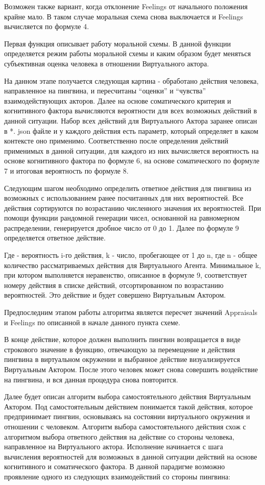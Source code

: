 Возможен также вариант, когда отклонение Feelings от начального положения крайне мало. В таком случае моральная схема снова выключается и Feelings вычисляется по формуле 4. 

Первая функция описывает работу моральной схемы. В данной функции определяется режим работы моральной схемы и каким образом будет меняться субъективная оценка человека в отношении Виртуального актора.

На данном этапе получается следующая картина - обработано действия человека, направленное на пингвина, и пересчитаны “оценки” и “чувства” взаимодействующих акторов. Далее на основе соматического критерия и когнитивного фактора вычисляются вероятности для всех возможных действий в данной ситуации. Набор всех действий для Виртуального Актора заранее описан в *. json файле и у каждого действия есть параметр, который определяет в каком контексте оно применимо. Соответственно после определения действий применимых в данной ситуации, для каждого из них вычисляется вероятность на основе когнитивного фактора по формуле 6, на основе соматического по формуле 7 и итоговая вероятность по формуле 8. 

Следующим шагом необходимо определить ответное действия для пингвина из возможных с использованием ранее посчитанных для них вероятностей. Все действия сортируются по возрастанию численного значения их вероятностей. При помощи функции рандомной генерации чисел, основанной на равномерном распределении, генерируется дробное число от 0 до 1. Далее по формуле 9 определяется ответное действие.

Где  - вероятность i-го действия, k - число, пробегающее от 1 до n, где n - общее количество рассматриваемых действия для Виртуального Агента. Минимальное k, при котором выполняется неравенство, описанное в формуле 9, соответствует номеру действия в списке действий, отсортированном по возрастанию вероятностей. Это действие и будет совершено Виртуальным Актором.

Предпоследним этапом работы алгоритма является пересчет значений Appraisals и Feelings по описанной в начале данного пункта схеме.

В конце действие, которое должен выполнить пингвин возвращается в виде строкового значение в функцию, отвечающую за перемещение и действия пингвина в виртуальном окружении и выбранное действие визуализируется Виртуальным Актором. После этого человек может снова совершить воздействие на пингвина, и вся данная процедура снова повторится. 

Далее будет описан алгоритм выбора самостоятельного действия Виртуальным Актором. Под самостоятельным действием понимается такой действия, которое предпринимает пингвин, основываясь на состоянии виртуального окружения и отношении с человеком. Алгоритм выбора самостоятельного действия схож с алгоритмом выбора ответного действия на действие со стороны человека, направленное на Виртуального актора. Исполнение начинается с шага вычисления вероятностей для возможных в данной ситуации действий на основе когнитивного и соматического фактора. В данной парадигме возможно проявление одного из следующих взаимодействий со стороны пингвина:

